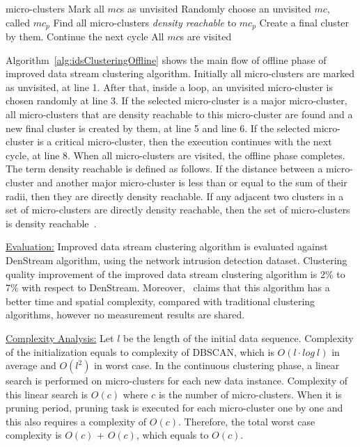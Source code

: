 \documentclass[smallcondensed]{svjour3}     %
\begin{document}
\begin{algorithm}
	\caption{Improved data stream clustering offline phase (micro-clusters)}
	\label{alg:idsClusteringOffline}
	\begin{algorithmic}[1]
		\Require micro-clusters
		\State Mark all $mc$s as unvisited
		\Repeat
		\State Randomly choose an unvisited $mc$, called $mc_p$
		\State Find all micro-clusters \textit{density reachable} to $mc_p$
		\State Create a final cluster by them.
		\State Continue the next cycle
		\EndIf
		\Until All $mc$s are visited
		
	\end{algorithmic}
\end{algorithm}

Algorithm~\ref{alg:idsClusteringOffline} shows the main flow of offline phase of improved data stream clustering algorithm. Initially all micro-clusters are marked as unvisited, at line 1. After that, inside a loop, an unvisited micro-cluster is chosen randomly at line 3. If the selected micro-cluster is a major micro-cluster, all micro-clusters that are density reachable to this micro-cluster are found and a new final cluster is created by them, at line 5 and line 6. If the selected micro-cluster is a critical micro-cluster, then the execution continues with the next cycle, at line 8. When all micro-clusters are visited, the offline phase completes. The term density reachable is defined as follows. If the distance between a micro-cluster and another major micro-cluster is less than or equal to the sum of their radii, then they are directly density reachable. If any adjacent two clusters in a set of micro-clusters are directly density reachable, then the set of micro-clusters is density reachable~\citep{Yin2017improvedClustering}.

\underline{Evaluation:} Improved data stream clustering algorithm is evaluated against DenStream algorithm, using the network intrusion detection dataset. Clustering quality improvement of the improved data stream clustering algorithm is 2\% to 7\% with respect to DenStream. Moreover,~\citet{Yin2017improvedClustering} claims that this algorithm has a better time and spatial complexity, compared with traditional clustering algorithms, however no measurement results are shared. 

\underline{Complexity Analysis:} Let $l$ be the length of the initial data sequence. Complexity of the initialization equals to complexity of DBSCAN, which is $O(l\cdot log \ l)$ in average and $O(l^2)$ in worst case. In the continuous clustering phase, a linear search is performed on micro-clusters for each new data instance. Complexity of this linear search is $O(c)$ where $c$ is the number of micro-clusters. When it is pruning period, pruning task is executed for each micro-cluster one by one and this also requires a complexity of $O(c)$. Therefore, the total worst case complexity is $O(c)$ + $O(c)$, which equals to $O(c)$.
\end{document}
